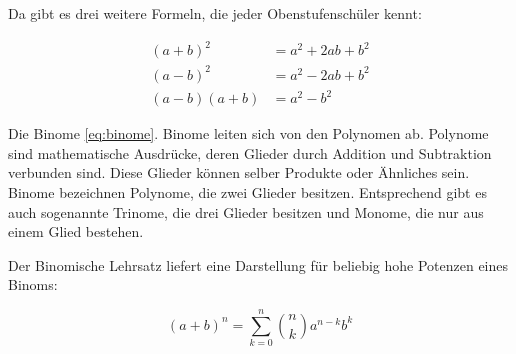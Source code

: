 
Da gibt es drei weitere Formeln, die jeder Obenstufenschüler kennt: 

\begin{align}
  (a+b)^{2}  &= a^{2} + 2ab + b^{2}   \label{eq:binome} \\
  (a-b)^{2}  &= a^{2} - 2ab + b^{2}   \nonumber         \\
  (a-b)(a+b) &= a^{2} - b^{2}         \nonumber
\end{align}

Die Binome \eqref{eq:binome}. Binome leiten sich von den Polynomen ab. Polynome sind mathematische Ausdrücke, deren Glieder durch Addition und Subtraktion verbunden sind. Diese Glieder können selber Produkte oder Ähnliches sein. Binome bezeichnen Polynome, die zwei Glieder besitzen. Entsprechend gibt es auch sogenannte Trinome, die drei Glieder besitzen und Monome, die nur aus einem Glied bestehen. 

\bigskip 

Der Binomische Lehrsatz liefert eine Darstellung für beliebig hohe Potenzen eines Binoms:

\begin{equation}
  (a+b)^n = \sum_{k=0}^n \binom{n}{k} a^{n-k} b^k
\end{equation}
